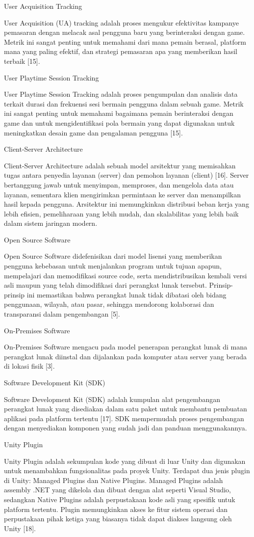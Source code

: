 User Acquisition Tracking

User Acquisition (UA) tracking adalah proses mengukur efektivitas kampanye pemasaran dengan melacak asal pengguna baru yang berinteraksi dengan game. Metrik ini sangat penting untuk memahami dari mana pemain berasal, platform mana yang paling efektif, dan strategi pemasaran apa yang memberikan hasil terbaik [15].

User Playtime Session Tracking

User Playtime Session Tracking adalah proses pengumpulan dan analisis data terkait durasi dan frekuensi sesi bermain pengguna dalam sebuah game. Metrik ini sangat penting untuk memahami bagaimana pemain berinteraksi dengan game dan untuk mengidentifikasi pola bermain yang dapat digunakan untuk meningkatkan desain game dan pengalaman pengguna [15].

Client-Server Architecture

Client-Server Architecture adalah sebuah model arsitektur yang memisahkan tugas antara penyedia layanan (server) dan pemohon layanan (client) [16]. Server bertanggung jawab untuk menyimpan, memproses, dan mengelola data atau layanan, sementara klien mengirimkan permintaan ke server dan menampilkan hasil kepada pengguna. Arsitektur ini memungkinkan distribusi beban kerja yang lebih efisien, pemeliharaan yang lebih mudah, dan skalabilitas yang lebih baik dalam sistem jaringan modern.

Open Source Software

Open Source Software didefenisikan dari model lisensi yang memberikan pengguna kebebasan untuk menjalankan program untuk tujuan apapun, mempelajari dan memodifikasi source code, serta mendistribusikan kembali versi asli maupun yang telah dimodifikasi dari perangkat lunak tersebut. Prinsip-prinsip ini memastikan bahwa perangkat lunak tidak dibatasi oleh bidang penggunaan, wilayah, atau pasar, sehingga mendorong kolaborasi dan transparansi dalam pengembangan [5].

On-Premises Software

On-Premises Software mengacu pada model penerapan perangkat lunak di mana perangkat lunak diinstal dan dijalankan pada komputer atau server yang berada di lokasi fisik [3].

Software Development Kit (SDK)

Software Development Kit (SDK) adalah kumpulan alat pengembangan perangkat lunak yang disediakan dalam satu paket untuk membantu pembuatan aplikasi pada platform tertentu [17]. SDK mempermudah proses pengembangan dengan menyediakan komponen yang sudah jadi dan panduan menggunakannya.

Unity Plugin

Unity Plugin adalah sekumpulan kode yang dibuat di luar Unity dan digunakan untuk menambahkan fungsionalitas pada proyek Unity. Terdapat dua jenis plugin di Unity: Managed Plugins dan Native Plugins. Managed Plugins adalah assembly .NET yang dikelola dan dibuat dengan alat seperti Visual Studio, sedangkan Native Plugins adalah perpustakaan kode asli yang spesifik untuk platform tertentu. Plugin memungkinkan akses ke fitur sistem operasi dan perpustakaan pihak ketiga yang biasanya tidak dapat diakses langsung oleh Unity [18].
